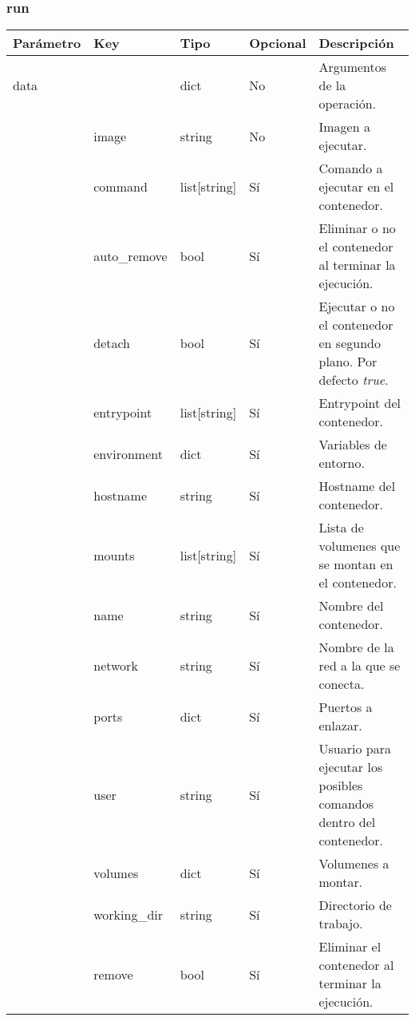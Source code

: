 		\subsubsection{run}
			\begin{table}[!h]
				\centering
	\begin{adjustbox}{max width=\textwidth}
				\begin{tabular}{|l|l|l|l|l|}
					\hline
					Parámetro & Key & Tipo & Opcional & Descripción \\ \hline
					data &  & dict & No & Argumentos de la operación. \\ \hline
					& image & string & No & Imagen a ejecutar. \\ \hline
					& command & list[string] & Sí & Comando a ejecutar en el contenedor. \\ \hline
					& auto\_remove & bool & Sí & Eliminar o no el contenedor al terminar la ejecución. \\ \hline
					& detach & bool & Sí & Ejecutar o no el contenedor en segundo plano. Por defecto \textit{true}. \\ \hline
					& entrypoint & list[string] & Sí & Entrypoint del contenedor. \\ \hline
					& environment & dict & Sí & Variables de entorno. \\ \hline
					& hostname & string & Sí & Hostname del contenedor. \\ \hline
					& mounts & list[string] & Sí & Lista de volumenes que se montan en el contenedor. \\ \hline
					& name & string & Sí & Nombre del contenedor. \\ \hline
					& network & string & Sí & Nombre de la red a la que se conecta. \\ \hline
					& ports & dict & Sí & Puertos a enlazar. \\ \hline
					& user & string & Sí & Usuario para ejecutar los posibles comandos dentro del contenedor. \\ \hline
					& volumes & dict & Sí & Volumenes a montar. \\ \hline
					& working\_dir & string & Sí & Directorio de trabajo. \\ \hline
					& remove & bool & Sí & Eliminar el contenedor al terminar la ejecución. \\ \hline
				\end{tabular}
\end{adjustbox}
			\end{table}
		
